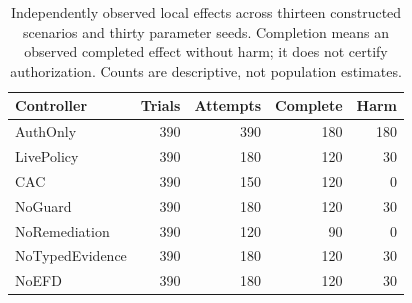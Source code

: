 \begin{table}[t]
\centering\small
\caption{Independently observed local effects across thirteen constructed scenarios and thirty parameter seeds. Completion means an observed completed effect without harm; it does not certify authorization. Counts are descriptive, not population estimates.}
\label{tab:repaired-results}
\begin{tabular}{@{}lrrrr@{}}
\toprule
Controller & Trials & Attempts & Complete & Harm \\
\midrule
AuthOnly & 390 & 390 & 180 & 180 \\
LivePolicy & 390 & 180 & 120 & 30 \\
CAC & 390 & 150 & 120 & 0 \\
NoGuard & 390 & 180 & 120 & 30 \\
NoRemediation & 390 & 120 & 90 & 0 \\
NoTypedEvidence & 390 & 180 & 120 & 30 \\
NoEFD & 390 & 180 & 120 & 30 \\
\bottomrule
\end{tabular}
\end{table}
